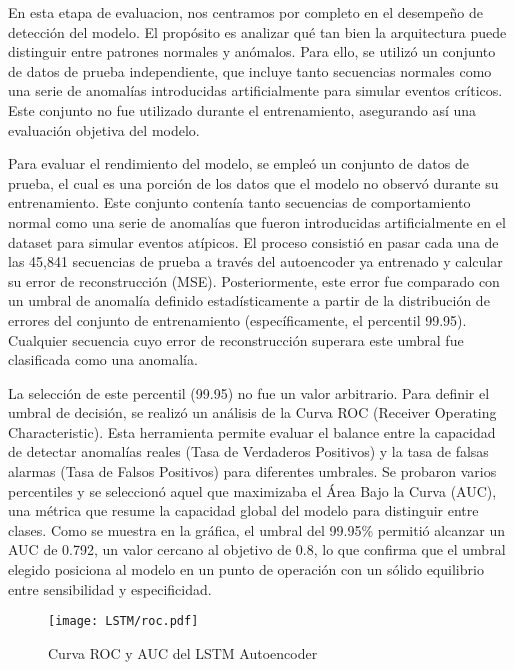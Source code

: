 
En esta etapa de evaluacion, nos centramos por completo en el desempeño de detección del modelo. El propósito es analizar qué tan bien la arquitectura puede distinguir entre patrones normales y anómalos. Para ello, se utilizó un conjunto de datos de prueba independiente, que incluye tanto secuencias normales como una serie de anomalías introducidas artificialmente para simular eventos críticos. Este conjunto no fue utilizado durante el entrenamiento, asegurando así una evaluación objetiva del modelo.


Para evaluar el rendimiento del modelo, se empleó un conjunto de datos de prueba, el cual es una porción de los datos que el modelo no observó durante su entrenamiento. Este conjunto contenía tanto secuencias de comportamiento normal como una serie de anomalías que fueron introducidas artificialmente en el dataset para simular eventos atípicos.
El proceso consistió en pasar cada una de las 45,841 secuencias de prueba a través del autoencoder ya entrenado y calcular su error de reconstrucción (MSE). Posteriormente, este error fue comparado con un umbral de anomalía definido estadísticamente a partir de la distribución de errores del conjunto de entrenamiento (específicamente, el percentil 99.95). Cualquier secuencia cuyo error de reconstrucción superara este umbral fue clasificada como una anomalía.

La selección de este percentil (99.95) no fue un valor arbitrario. Para definir el umbral de decisión, se realizó un análisis de la Curva ROC (Receiver Operating Characteristic). Esta herramienta permite evaluar el balance entre la capacidad de detectar anomalías reales (Tasa de Verdaderos Positivos) y la tasa de falsas alarmas (Tasa de Falsos Positivos) para diferentes umbrales. Se probaron varios percentiles y se seleccionó aquel que maximizaba el Área Bajo la Curva (AUC), una métrica que resume la capacidad global del modelo para distinguir entre clases. Como se muestra en la gráfica, el umbral del 99.95\% permitió alcanzar un AUC de 0.792, un valor cercano al objetivo de 0.8, lo que confirma que el umbral elegido posiciona al modelo en un punto de operación con un sólido equilibrio entre sensibilidad y especificidad.

\begin{figure}[ht!]
      \centering
      \texttt{[image: LSTM/roc.pdf]}
      \caption{Curva ROC y AUC del LSTM Autoencoder}
      \label{fig:roc_lstm}
\end{figure}

